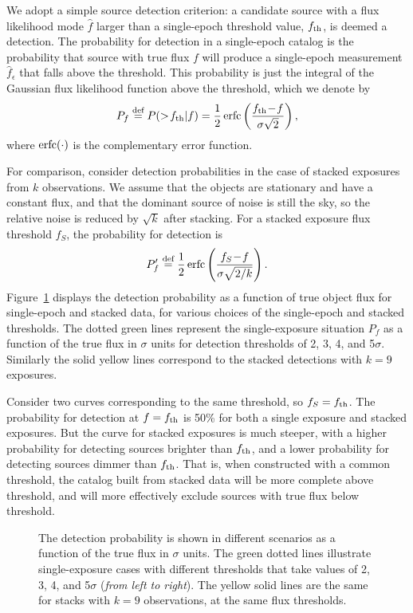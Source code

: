 \documentclass[twocolumn]{emulateapj}
\newcommand{\erfc}{{\rm{}erfc}}
\newcommand*{\defeq}{\stackrel{\text{def}}{=}}
\newcommand{\eind}{\epsilon}  %
\newcommand{\flux}{f}
\newcommand{\fest}{\hat{\flux}}  %
\newcommand{\fth}{\flux_{\rm th}}
\begin{document}
We adopt a simple source detection criterion: a candidate source with a flux likelihood mode $\fest$ larger than a single-epoch threshold value, $\fth$, is deemed a detection.
The probability for detection in a single-epoch catalog is the probability that source with true flux $f$ will produce a single-epoch measurement $\fest_\eind$ that falls above the threshold.
This probability is just the integral of the Gaussian flux likelihood function above the threshold, which we denote by
%
\begin{equation}\label{eq:pf}
P_f \defeq P(>\!\fth|f) = \frac{1}{2}\,\erfc\left(\frac{\fth\!-\!f}{\sigma\sqrt{2}}\right),
\end{equation}
%
where $\erfc(\cdot)$ is the complementary error function.
 
For comparison, consider detection probabilities in the case of stacked exposures from $k$ observations.
We assume that the objects are stationary and have a constant flux, and that the dominant source of noise is still the sky, so the relative noise is reduced by $\sqrt{k}$ after stacking.
For a stacked exposure flux threshold $f_S$, the probability for detection is
%
\begin{equation}
P'_f \defeq \frac{1}{2}\,\erfc\left(\frac{f_S\!-\!f}{\sigma\sqrt{2/k}}\right).
\end{equation}
%
Figure~\ref{fig:1} displays the detection probability as a function of true object flux for single-epoch and stacked data, for various choices of the single-epoch and stacked thresholds.
The dotted green lines represent the single-exposure situation $P_f$ as a function of the true flux in $\sigma$ units for detection thresholds of 2, 3, 4, and 5$\sigma$.
Similarly the solid yellow lines correspond to the stacked detections with \mbox{$k\!=\!9$} exposures.

Consider two curves corresponding to the same threshold, so $f_S = \fth$.
The probability for detection at $f=\fth$ is 50\% for both a single exposure and stacked exposures.
But the curve for stacked exposures is much steeper, with a higher probability for detecting sources brighter than $\fth$, and a lower probability for detecting sources dimmer than $\fth$.
That is, when constructed with a common threshold, the catalog built from stacked data will be more complete above threshold, and will more effectively exclude sources with true flux below threshold.



\begin{figure}
\caption{The detection probability is shown in different scenarios as a function of the true flux in $\sigma$ units. The green dotted lines illustrate single-exposure cases with different thresholds that take values of 2, 3, 4, and 5$\sigma$ ({\it{}from left to right}). The yellow solid lines are the same for stacks with \mbox{$k\!=\!9$} observations, at the same flux thresholds.}
\label{fig:1}
\end{figure}
\end{document}
